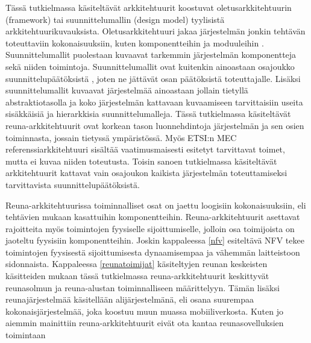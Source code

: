 Tässä tutkielmassa käsiteltävät arkkitehtuurit koostuvat oletusarkkitehtuurin (framework) tai suunnittelumallin (design model) tyylisistä arkkitehtuurikuvauksista. 
Oletusarkkitehtuuri jakaa järjestelmän jonkin tehtävän toteuttaviin kokonaisuuksiin, kuten komponentteihin ja moduuleihin \cite{ohark}. 
Suunnittelumallit puolestaan kuvaavat tarkemmin järjestelmän komponentteja sekä niiden toimintoja. Suunnittelumallit ovat kuitenkin ainoastaan osajoukko suunnittelupäätöksistä \cite{ohark2}, joten ne jättävät osan päätöksistä toteuttajalle. Lisäksi suunnittelumallit kuvaavat järjestelmää ainoastaan jollain tietyllä abstraktiotasolla ja koko järjestelmän kattavaan kuvaamiseen tarvittaisiin useita sisäkkäisiä ja hierarkkisia suunnittelumalleja. 
Tässä tutkielmassa käsiteltävät reuna-arkkitehtuurit ovat korkean tason luonnehdintoja järjestelmän ja sen osien toiminnasta, jossain tietyssä ympäristössä.
Myös ETSI:n MEC referenssiarkkitehtuuri \cite{etsirefarch} sisältää vaatimusmaisesti esitetyt tarvittavat toimet, mutta ei kuvaa niiden toteutusta.
Toisin sanoen tutkielmassa käsiteltävät arkkitehtuurit kattavat vain osajoukon kaikista järjestelmän toteuttamiseksi tarvittavista suunnittelupäätöksistä.
 
Reuna-arkkitehtuurissa toiminnalliset osat on jaettu loogisiin kokonaisuuksiin, eli tehtävien mukaan kasattuihin komponentteihin. Reuna-arkkitehtuurit asettavat rajoitteita myös toimintojen fyysiselle sijoittumiselle, jolloin osa toimijoista on jaoteltu fyysisiin komponentteihin. Joskin kappaleessa \ref{nfv} esiteltävä NFV tekee toimintojen fyysisestä sijoittumisesta dynaamisempaa ja vähemmän laitteistoon sidonnaista. 
Kappaleessa \ref{reunatoimijat} käsiteltyjen reunan keskeisten käsitteiden mukaan tässä tutkielmassa reuna-arkkitehtuurit keskittyvät reunasolmun ja reuna-alustan toiminnalliseen määrittelyyn. 
Tämän lisäksi reunajärjestelmää käsitellään alijärjestelmänä, eli osana suurempaa kokonaisjärjestelmää, joka koostuu muun muassa mobiiliverkosta.
Kuten jo aiemmin mainittiin reuna-arkkitehtuurit eivät ota kantaa reunasovelluksien toimintaan



